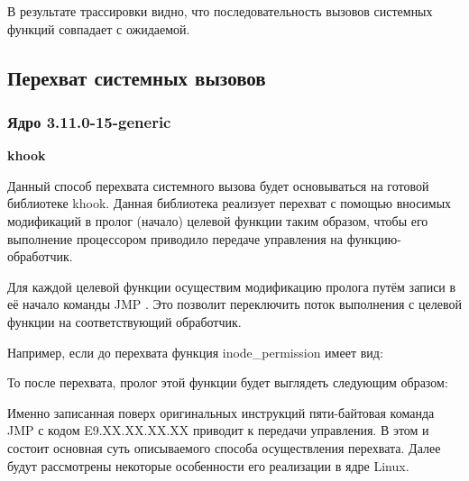  
 
  

\par В результате трассировки видно, что  последовательность вызовов системных функций совпадает с ожидаемой.



\subsection{Перехват системных вызовов} %


\subsubsection{Ядро 3.11.0-15-generic}

\textbf{khook}

\par Данный способ перехвата системного вызова будет основываться на готовой библиотеке khook. Данная библиотека реализует перехват с помощью вносимых модификаций в пролог (начало) целевой функции таким образом, чтобы его выполнение процессором приводило передаче управления на функцию-обработчик. \\

\par Для каждой целевой функции осуществим модификацию пролога путём записи в её начало команды JMP . Это позволит переключить поток выполнения с целевой функции на соответствующий обработчик. \\ 

\par Например, если до перехвата функция inode\_permission имеет вид:

 

\par То после перехвата, пролог этой функции будет выглядеть следующим образом:

 

\par Именно записанная поверх оригинальных инструкций пяти-байтовая команда JMP с кодом E9.XX.XX.XX.XX приводит к передачи управления. В этом и состоит основная суть описываемого способа осуществления перехвата. Далее будут рассмотрены некоторые особенности его реализации в ядре Linux.

